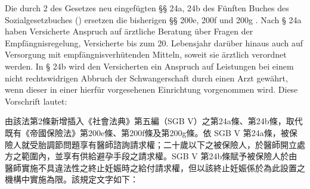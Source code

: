 \documentclass[12pt]{article}
\begin{document}
\begin{sourcepara}[title={原文理由 A.II.3.a SGB V}]
Die durch \abbrArt{} 2 des Gesetzes neu eingefügten §§ 24a, 24b des Fünften Buches des Sozialgesetzbuches (\abbrSGBV{}) ersetzen die bisherigen §§ 200e, 200f und 200g \abbrRVO{}. Nach § 24a \abbrSGBV{} haben Versicherte Anspruch auf ärztliche Beratung über Fragen der Empfängnisregelung, Versicherte bis zum 20. Lebensjahr darüber hinaus auch auf Versorgung mit empfängnisverhütenden Mitteln, soweit sie ärztlich verordnet werden. In § 24b \abbrSGBV{} wird den Versicherten ein Anspruch auf Leistungen bei einem nicht rechtswidrigen Abbruch der Schwangerschaft durch einen Arzt gewährt, wenn dieser in einer hierfür vorgesehenen Einrichtung vorgenommen wird. Diese Vorschrift lautet:
\end{sourcepara}
\begin{transpara}
由該法第2條新增插入《社會法典》第五編（SGB V）之第24a條、第24b條，取代既有《帝國保險法》第200e條、第200f條及第200g條。依 SGB V 第24a條，被保險人就受胎調節問題享有醫師諮詢請求權；二十歲以下之被保險人，於醫師開立處方之範圍內，並享有供給避孕手段之請求權。SGB V 第24b條賦予被保險人於由醫師實施不具違法性之終止妊娠時之給付請求權，但以該終止妊娠係於為此設置之機構中實施為限。該規定文字如下：
\end{transpara}
\end{document}
